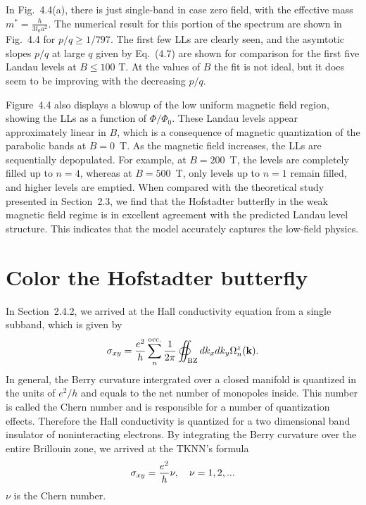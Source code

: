 In Fig.~4.4(a), there is just single-band in case zero field, with the effective mass $m^{*} = \frac{\hbar}{3 t_{0} a^{2}}$. The numerical result for this portion of the spectrum are shown in Fig.~4.4 for $p/q \geq 1/797$. The first few \acp{LL} are clearly seen, and the asymtotic slopes $p/q$ at large $q$ given by Eq.~(4.7) are shown for comparison for the first five Landau levels at $B \leq 100$ T. At the values of $B$ the fit is not ideal, but it does seem to be improving with the decreasing $p/q$.

Figure~4.4 also displays a blowup of the low uniform magnetic field region, showing the \acp{LL} as a function of $\Phi / \Phi_{0}$. These Landau levels appear approximately linear in $B$, which is a consequence of magnetic quantization of the parabolic bands at $B = 0$~T. As the magnetic field increases, the \acp{LL} are sequentially depopulated. For example, at $B = 200$~T, the levels are completely filled up to $n = 4$, whereas at $B = 500$~T, only levels up to $n = 1$ remain filled, and higher levels are emptied. When compared with the theoretical study presented in Section~2.3, we find that the Hofstadter butterfly in the weak magnetic field regime is in excellent agreement with the predicted Landau level structure. This indicates that the model accurately captures the low-field physics.


\section{Color the Hofstadter butterfly}
In Section~2.4.2, we arrived at the Hall conductivity equation from a single subband, which is given by \cite{kohmoto1989,hatsugai1990energy,kohmoto1985topological,thouless1982}
\begin{gather}
\sigma_{xy} = \dfrac{e^{2}}{h} \sum_{n}^{\text{occ.}} \dfrac{1}{2\pi} \displaystyle\oiint_{\text{{BZ}}} d k_{x} d k_{y} \Omega_{n}^{z} (\mathbf{k}).
\end{gather}
In general, the Berry curvature intergrated over a closed manifold is quantized in the units of $e^{2} / h$ and equals to the net number of monopoles inside. This number is called the Chern number and is responsible for a number of quantization effects. Therefore the Hall conductivity is quantized for a two dimensional band insulator of noninteracting electrons. By integrating the Berry curvature over the entire Brillouin zone, we arrived at the \ac{TKNN}'s formula \cite{thouless1982}
\begin{gather}
\sigma_{xy} = \dfrac{e^{2}}{h} \nu, \quad \nu = 1,2,...
\end{gather}
$\nu$ is the Chern number.

